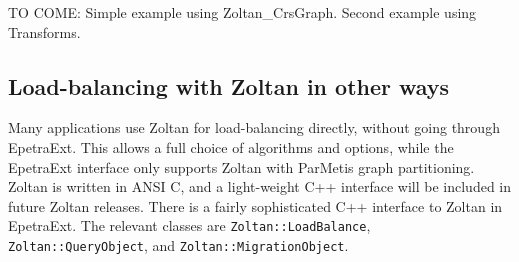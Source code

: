 TO COME:
Simple example using Zoltan\_CrsGraph. 
Second example using Transforms.


\subsection{Load-balancing with Zoltan in other ways}

Many applications use Zoltan for load-balancing directly, without
going through EpetraExt. This allows a full choice of algorithms
and options, while the EpetraExt interface only supports
Zoltan with ParMetis graph partitioning. Zoltan is written in ANSI C,
and a light-weight C++ interface will be included in future Zoltan
releases.  There is a fairly sophisticated
C++ interface to Zoltan in EpetraExt. The relevant classes
are \verb!Zoltan::LoadBalance!, \verb!Zoltan::QueryObject!,
and \verb!Zoltan::MigrationObject!. 

